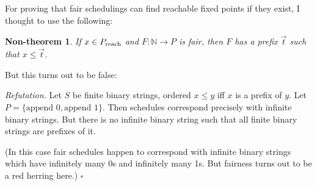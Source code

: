 \documentclass{article}
\newcommand{\N}{\mathbb{N}}
\newcommand{\todo}[1]{{\color{red}{#1}}}
\newtheorem{corollary}{Corollary}
\newtheorem{nontheorem}{Non-theorem}
\newenvironment{refutation}
  {\vspace{0.5em}\noindent\textit{Refutation.}}
  {\hfill$\square$\vspace{0.5em}}
\begin{document}
For proving that fair schedulings can find reachable fixed points if they exist,
I thought to use the following:

\begin{nontheorem}
  If $x \in {P}_{\text{reach}}$ and $F : \N \to P$ is fair, then $F$ has a prefix
  $\vec{t}$ such that $x \le \vec{t}$.
\end{nontheorem}

But this turns out to be false:

\begin{refutation}
  Let $S$ be finite binary strings, ordered $x \le y$ iff $x$ is a prefix of
  $y$. Let $P = \{\text{append }0, \text{append }1\}$. Then schedules correspond
  precisely with infinite binary strings. But there is no infinite binary string
  such that all finite binary strings are prefixes of it.

  (In this case fair schedules happen to correspond with infinite binary strings
  which have infinitely many 0s and infinitely many 1s. But fairness turns out
  to be a red herring here.)
\end{refutation}



\end{document}
